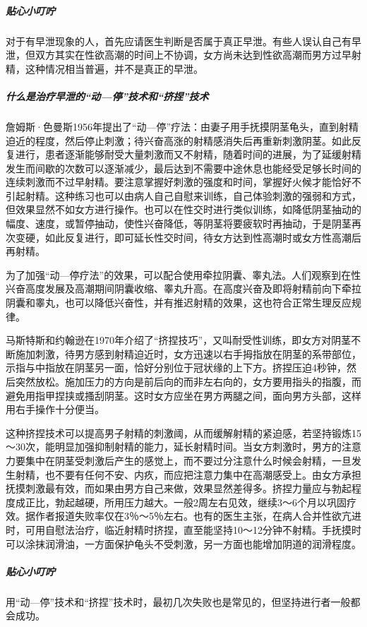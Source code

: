\subparagraph{贴心小叮咛}

对于有早泄现象的人，首先应请医生判断是否属于真正早泄。有些人误认自己有早泄，但双方其实在性欲高潮的时间上不协调，女方尚未达到性欲高潮而男方过早射精，这种情况相当普遍，并不是真正的早泄。

\subparagraph{什么是治疗早泄的“动—停”技术和“挤捏”技术}

詹姆斯·色曼斯1956年提出了“动—停”疗法：由妻子用手抚摸阴茎龟头，直到射精迫近的程度，然后停止刺激；待兴奋高涨的射精感消失后再重新刺激阴茎。如此反复进行，患者逐渐能够耐受大量刺激而又不射精，随着时间的进展，为了延缓射精发生而间歇的次数可以逐渐减少，最后达到不需要中途休息也能经受足够长时间的连续刺激而不过早射精。要注意掌握好刺激的强度和时间，掌握好火候才能恰好不引起射精。这种练习也可以由病人自己自慰来训练，自己体验刺激的强弱和方式，但效果显然不如女方进行操作。也可以在性交时进行类似训练，如降低阴茎抽动的幅度、速度，或暂停抽动，使性兴奋降低，等阴茎将要疲软时再抽动，于是阴茎再次变硬，如此反复进行，即可延长性交时间，待女方达到性高潮时或女方性高潮后再射精。

为了加强“动—停疗法”的效果，可以配合使用牵拉阴囊、睾丸法。人们观察到在性兴奋高度发展及高潮期间阴囊收缩、睾丸升高。在高度兴奋及即将射精前向下牵拉阴囊和睾丸，也可以降低兴奋性，并有推迟射精的效果，这也符合正常生理反应规律。

马斯特斯和约翰逊在1970年介绍了“挤捏技巧”，又叫耐受性训练，即女方对阴茎不断施加刺激，待男方感到射精迫近时，女方迅速以右手拇指放在阴茎的系带部位，示指与中指放在阴茎另一面，恰好分别位于冠状缘的上下方。挤捏压迫4秒钟，然后突然放松。施加压力的方向是前后向的而非左右向的，女方要用指头的指腹，而避免用指甲捏挟或搔刮阴茎。这时女方应坐在男方两腿之间，面向男方头部，这样用右手操作十分便当。

这种挤捏技术可以提高男子射精的刺激阈，从而缓解射精的紧迫感，若坚持锻炼15～30次，能明显加强抑制射精的能力，延长射精时间。当女方刺激时，男方的注意力要集中在阴茎受刺激后产生的感觉上，而不要过分注意什么时候会射精，一旦发生射精，也不要有任何不安、内疚，而应把注意力集中在高潮感受上。由女方承担抚摸刺激最有效，而如果由男方自己来做，效果显然差得多。挤捏力量应与勃起程度成正比，勃起越硬，所用压力越大。一般2周左右见效，继续3～6个月以巩固疗效。据作者报道失败率仅在3％～5％左右。也有的医生主张，在病人合并性欲亢进时，可用自慰法治疗，临近射精时挤捏，直至能坚持10～12分钟不射精。手抚摸时可以涂抹润滑油，一方面保护龟头不受刺激，另一方面也能增加阴道的润滑程度。

\subparagraph{贴心小叮咛}

用“动—停”技术和“挤捏”技术时，最初几次失败也是常见的，但坚持进行者一般都会成功。

